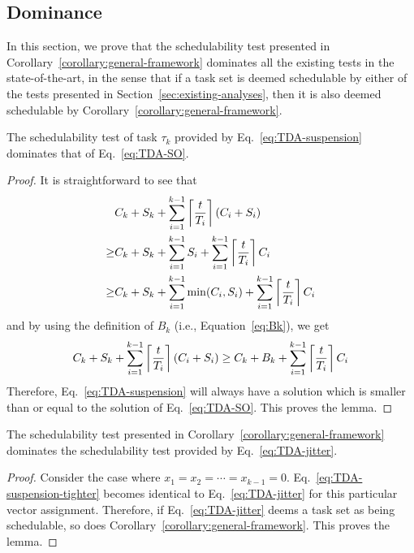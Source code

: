 \subsection{Dominance}

In this section, we prove that the schedulability test presented in Corollary~\ref{corollary:general-framework} dominates all the existing tests in the state-of-the-art, in the sense that if a task set is deemed schedulable by either of the tests presented in Section~\ref{sec:existing-analyses}, then it is also deemed schedulable by Corollary~\ref{corollary:general-framework}.

\begin{Lemma}
\label{lem:dominance_oblivious}
  The schedulability test of task $\tau_k$ provided by
  Eq.~\eqref{eq:TDA-suspension} dominates that of
  Eq.~\eqref{eq:TDA-SO}.
\end{Lemma}
\begin{proof}
It is straightforward to see that
\begin{align*}
& C_k + S_k + \sum_{i=1}^{k-1}\left\lceil{\frac{t}{T_i}}\right\rceil (C_i + S_i) \\
 \geq & C_k + S_k + \sum_{i=1}^{k-1} S_i + \sum_{i=1}^{k-1}\left\lceil{\frac{t}{T_i}}\right\rceil C_i\\
 \geq & C_k + S_k + \sum_{i=1}^{k-1} \min(C_i, S_i) + \sum_{i=1}^{k-1}\left\lceil{\frac{t}{T_i}}\right\rceil C_i
\end{align*}
and by using the definition of $B_k$ (i.e., Equation~\eqref{eq:Bk}), we get
\begin{align*}
C_k + S_k + \sum_{i=1}^{k-1}\left\lceil{\frac{t}{T_i}}\right\rceil (C_i + S_i) \geq C_k + B_k + \sum_{i=1}^{k-1}\left\lceil{\frac{t}{T_i}}\right\rceil C_i
\end{align*}
Therefore, Eq.~\eqref{eq:TDA-suspension} will always have a solution which is smaller than or equal to the solution of Eq.~\eqref{eq:TDA-SO}. This proves the lemma.
\end{proof}

\begin{Lemma}
  \label{lem:dominance_jitter}
  The schedulability test presented in
  Corollary~\ref{corollary:general-framework} dominates the
  schedulability test provided by Eq.~\eqref{eq:TDA-jitter}.
\end{Lemma}
\begin{proof}
  Consider the case where $x_1=x_2=\cdots=x_{k-1}=0$. Eq.~\eqref{eq:TDA-suspension-tighter} becomes identical to Eq.~\eqref{eq:TDA-jitter} for this particular vector assignment. Therefore, if Eq.~\eqref{eq:TDA-jitter} deems a task set as being schedulable, so does Corollary~\ref{corollary:general-framework}. This proves the lemma. 
\end{proof}
  

